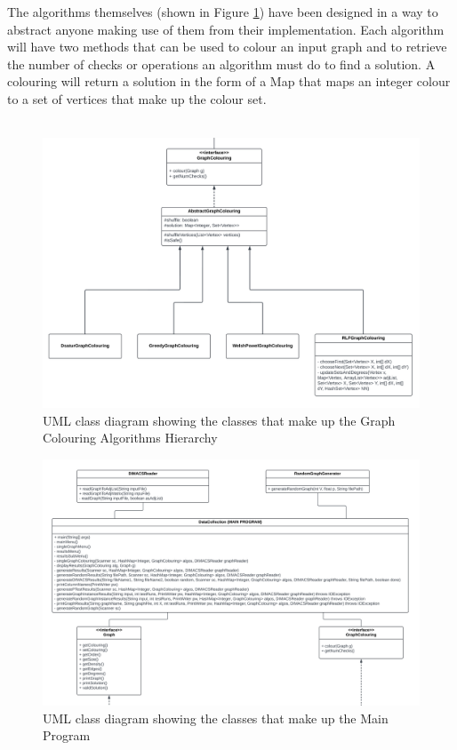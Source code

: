 The algorithms themselves (shown in Figure \ref{fig:GraphColouringHierarchy}) have been designed in a way to abstract anyone making use of them from their implementation. Each algorithm will have two methods that can be used to colour an input graph and to retrieve the number of checks or operations an algorithm must do to find a solution. A colouring will return a solution in the form of a Map that maps an integer colour to a set of vertices that make up the colour set. 
\\\\

\begin{figure}[H]
    \centering
    \includegraphics[width=0.9\linewidth]{Components/ColouringHierarchy.png}
    \caption{UML class diagram showing the classes that make up the Graph Colouring Algorithms Hierarchy}
    \label{fig:GraphColouringHierarchy}
\end{figure}

\begin{figure}[H]
    \centering
    \includegraphics[width=0.9\linewidth]{Components/MainProgram.png}
    \caption{UML class diagram showing the classes that make up the Main Program}
    \label{fig:MainProgram}
\end{figure}

